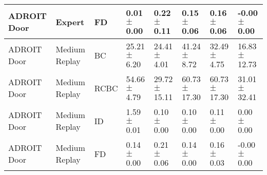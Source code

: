 \begin{table*}
\begin{tabular}{l l l l l l l l}
ADROIT Door &        Expert &   FD &   0.01 $\pm$ 0.00 &   0.22 $\pm$ 0.11 &   0.15 $\pm$ 0.06 &   0.16 $\pm$ 0.06 &  \cellcolor[rgb]{0.01,0.00,0.00} -0.00 $\pm$ 0.00 \\
    \midrule
ADROIT Door & Medium Replay &   BC &  25.21 $\pm$ 6.20 &  24.41 $\pm$ 4.01 &  41.24 $\pm$ 8.72 &  32.49 $\pm$ 4.75 & \cellcolor[rgb]{0.00,0.84,0.00} 16.83 $\pm$ 12.73 \\
ADROIT Door & Medium Replay & RCBC &  54.66 $\pm$ 4.79 & 29.72 $\pm$ 15.11 & 60.73 $\pm$ 17.30 & 60.73 $\pm$ 17.30 &    \cellcolor[rgb]{0.0,1.0,0.0} 31.01 $\pm$ 32.41 \\
ADROIT Door & Medium Replay &   ID &   1.59 $\pm$ 0.01 &   0.10 $\pm$ 0.00 &   0.10 $\pm$ 0.00 &   0.11 $\pm$ 0.00 &   \cellcolor[rgb]{0.00,0.01,0.00} 0.00 $\pm$ 0.00 \\
ADROIT Door & Medium Replay &   FD &   0.14 $\pm$ 0.00 &   0.21 $\pm$ 0.06 &   0.14 $\pm$ 0.00 &   0.16 $\pm$ 0.03 &  \cellcolor[rgb]{0.01,0.00,0.00} -0.00 $\pm$ 0.00 \\
    \midrule
    \bottomrule
  \end{tabular}
\end{table*}
